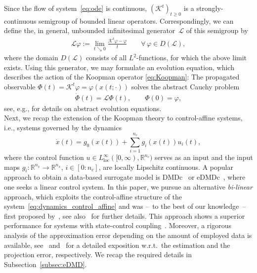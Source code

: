 \documentclass{article}
\numberwithin{equation}{section}
\newcommand{\R}{\mathbb{R}}
\newcommand{\nx}{n_x}
\newcommand{\nc}{n_c}
\newcommand{\calK}{\mathcal K}
\newcommand{\calL}{\mathcal L}
\begin{document}
	Since the flow of system~\eqref{eq:ode} is continuous, $(\calK^t)_{t \geq 0}$ is a strongly-continuous semigroup of bounded linear operators. 
	Correspondingly, we can define the, in general, unbounded infinitesimal generator~$\mathcal{L}$ of this semigroup by
	\begin{align}\label{eq:generator}
	\calL \varphi := \lim_{t \searrow 0}\frac{\calK^t \varphi - \varphi}{t} \qquad \forall\, \varphi \in D(\calL),
	\end{align}
	where the domain $D(\calL)$ consists of all $L^2$-functions, for which the above limit exists. 
	Using this generator, we may formulate an evolution equation, which describes the action of the Koopman operator \eqref{eq:Koopman}: The propagated observable $\Phi(t)= \calK^t\varphi = \varphi(x(t;\cdot))$ solves the abstract Cauchy problem
	\begin{align}\label{eq:Cauchy_problem}
	\dot \Phi(t) = \calL \Phi(t), \qquad \Phi(0)=\varphi,
	\end{align}
	see, e.g., \cite{CurtZwar12} for details on abstract evolution equations.\\
	
	\noindent Next, we recap the extension of the Koopman theory to control-affine systems, i.e., systems governed by the dynamics
	\begin{equation}\label{eq:dynamics_control_affine}
	\dot{x}(t) = g_0(x(t)) + \sum_{i=1}^{\nc} g_i(x(t)) u_i(t),
	\end{equation}
	where the control function $u \in L^\infty_{\operatorname{loc}}([0,\infty),\R^{\nc})$ serves as an input and the input maps $g_i:\R^{\nx} \to \R^{\nx}$, $i \in [0:\nc]$, are locally Lipschitz continuous.
	A popular approach to obtain a data-based surrogate model is DMDc~\cite{ProcBrun16} or eDMDc~\cite{KordMezi18b}, where one seeks a linear control system. In this paper, we pursue an alternative \emph{bi-linear} approach, which exploits the control-affine structure of the system~\eqref{eq:dynamics_control_affine} and was --~to the best of our knowledge~-- first proposed by~\cite{WillHema2016,Sura16}, see also~\cite{PeitOtto20} for further details. 
	This approach shows a superior performance for systems with state-control coupling~\cite{BrudFu21,FolkBurd21,BoldEsch23}. Moreover, a rigorous analysis of the approximation error depending on the amount of employed data is available, see~\cite{NuskPeit23} and~\cite{SchaWort23} for a detailed exposition w.r.t.\ the estimation and the projection error, respectively. We recap the required details in Subsection~\ref{subsec:eDMD}.
	
\end{document}
